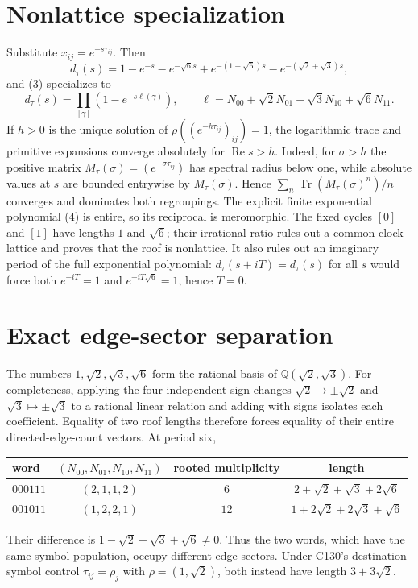 \documentclass[10pt]{article}
\begin{document}
\section{Nonlattice specialization}
Substitute $x_{ij}=e^{-s\tau_{ij}}$.  Then
\begin{equation}
d_\tau(s)=1-e^{-s}-e^{-\sqrt6s}
+e^{-(1+\sqrt6)s}-e^{-(\sqrt2+\sqrt3)s}, \tag{4}
\end{equation}
and (3) specializes to
\[
d_\tau(s)=\prod_{[\gamma]}
(1-e^{-s\ell(\gamma)}),\qquad
\ell=N_{00}+\sqrt2N_{01}+\sqrt3N_{10}+\sqrt6N_{11}.
\]
If $h>0$ is the unique solution of
$\rho((e^{-h\tau_{ij}})_{ij})=1$, the logarithmic trace and primitive
expansions converge absolutely for $\operatorname{Re}s>h$.  Indeed, for
$\sigma>h$ the positive matrix $M_\tau(\sigma)=(e^{-\sigma\tau_{ij}})$ has
spectral radius below one, while absolute values at $s$ are bounded entrywise
by $M_\tau(\sigma)$.  Hence
$\sum_n\operatorname{Tr}(M_\tau(\sigma)^n)/n$ converges and dominates both
regroupings.  The explicit finite exponential polynomial (4) is entire, so
its reciprocal is meromorphic.  The fixed cycles $[0]$ and $[1]$ have lengths
$1$ and $\sqrt6$; their irrational ratio rules out a common clock lattice and
proves that the roof is nonlattice.  It also rules out an imaginary period of
the full exponential polynomial: $d_\tau(s+iT)=d_\tau(s)$ for all $s$ would
force both $e^{-iT}=1$ and $e^{-iT\sqrt6}=1$, hence $T=0$.

\section{Exact edge-sector separation}
The numbers $1,\sqrt2,\sqrt3,\sqrt6$ form the rational basis of
$\mathbb Q(\sqrt2,\sqrt3)$.  For completeness, applying the four independent
sign changes $\sqrt2\mapsto\pm\sqrt2$ and
$\sqrt3\mapsto\pm\sqrt3$ to a rational linear relation and adding with signs
isolates each coefficient.  Equality of two roof lengths therefore forces
equality of their entire directed-edge-count vectors.  At period six,
\begin{center}
\begin{tabular}{@{}lccc@{}}
\toprule
word & $(N_{00},N_{01},N_{10},N_{11})$ & rooted multiplicity & length\\
\midrule
$000111$ & $(2,1,1,2)$ & $6$ & $2+\sqrt2+\sqrt3+2\sqrt6$\\
$001011$ & $(1,2,2,1)$ & $12$ & $1+2\sqrt2+2\sqrt3+\sqrt6$\\
\bottomrule
\end{tabular}
\end{center}
Their difference is
$1-\sqrt2-\sqrt3+\sqrt6\ne0$.  Thus the two words, which have the same
symbol population, occupy different edge sectors.  Under C130's
destination-symbol control $\tau_{ij}=\rho_j$ with
$\rho=(1,\sqrt2)$, both instead have length $3+3\sqrt2$.
\end{document}
